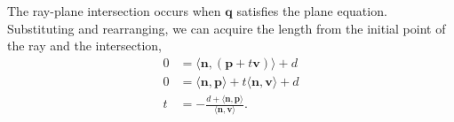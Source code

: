 \begin{frame}
\begin{minipage}[t]{0.45\linewidth}
\begin{equation}
		\end{equation}
		\begin{annotatedEquationEnv}
		\end{annotatedEquationEnv}
	\end{minipage}
	\par\noindent The ray-plane intersection occurs when \(\mathbf{q}\) satisfies the plane equation. Substituting and rearranging, we can acquire the length from the initial point of the ray and the intersection,
	\begin{align}
		0 & = \langle \mathbf{n}, \left( \mathbf{p} + t \mathbf{v} \right) \rangle + d                    \\
		0 & = \langle \mathbf{n}, \mathbf{p} \rangle + t \langle \mathbf{n},\mathbf{v} \rangle + d        \\
		t & = -\frac{d + \langle \mathbf{n}, \mathbf{p} \rangle}{\langle \mathbf{n}, \mathbf{v} \rangle}.
	\end{align}
\end{frame}
